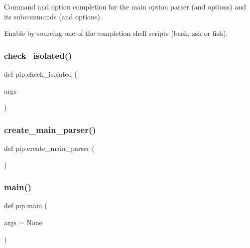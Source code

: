 \begin{DoxyVerb}Command and option completion for the main option parser (and options)
and its subcommands (and options).

Enable by sourcing one of the completion shell scripts (bash, zsh or fish).
\end{DoxyVerb}
 \mbox{\label{namespacepip_a76565cf9ec2dc79a313203cf5d6ad168}} 
\subsubsection{\texorpdfstring{check\+\_\+isolated()}{check\_isolated()}}
{\footnotesize\ttfamily def pip.\+check\+\_\+isolated (\begin{DoxyParamCaption}\item[{}]{args }\end{DoxyParamCaption})}

\mbox{\label{namespacepip_abf30ff63e79801a96948f0af0e43ee81}} 
\subsubsection{\texorpdfstring{create\+\_\+main\+\_\+parser()}{create\_main\_parser()}}
{\footnotesize\ttfamily def pip.\+create\+\_\+main\+\_\+parser (\begin{DoxyParamCaption}{ }\end{DoxyParamCaption})}

\mbox{\label{namespacepip_a1340561c3142d80bbe6ac01d74fa79e2}} 
\subsubsection{\texorpdfstring{main()}{main()}}
{\footnotesize\ttfamily def pip.\+main (\begin{DoxyParamCaption}\item[{}]{args = {\ttfamily None} }\end{DoxyParamCaption})}

\mbox{\label{namespacepip_a375e25522dc069b7d02f756f4034e30f}} 
